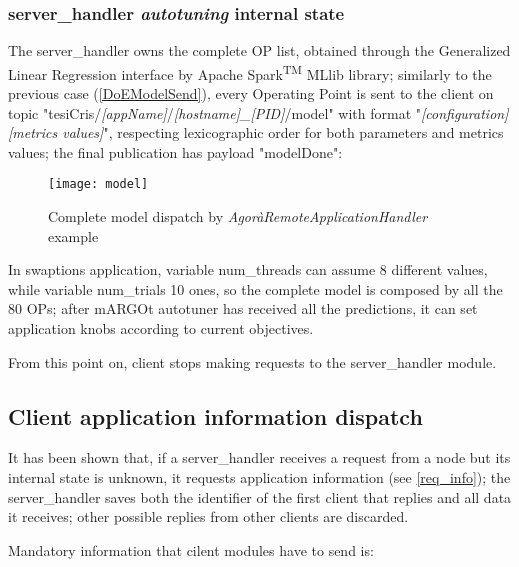 \subsubsection{server\_handler \textit{autotuning} internal state}\label{modelSend}

The server\_handler owns the complete OP list, obtained through the Generalized Linear Regression interface by Apache Spark\textsuperscript{TM} MLlib library; similarly to the previous case (\ref{DoEModelSend}), every Operating Point is sent to the client on topic "tesiCris\slash{}\textit{[app\-Name]}\slash{}\textit{[host\-name]\_[PID]}\slash{}model" with format "\textit{[configuration] [metrics values]}", respecting lexicographic order for both parameters and metrics values; the final publication has payload "modelDone":

\begin{figure}[H]

    \centering
    \texttt{[image: model]}
    \caption{Complete model dispatch by \textit{AgoràRemoteApplicationHandler} example}
    \label{fig:model}
    
\end{figure}

In swaptions application, variable num\_threads can assume 8 different values, while variable num\_trials 10 ones, so the complete model is composed by all the 80 OPs; after mARGOt autotuner has received all the predictions, it can set application knobs according to current objectives.

From this point on, client stops making requests to the ser\-ver\_han\-dler module.





\subsection{Client application information dispatch}\label{client_info}

It has been shown that, if a server\_handler receives a request from a node but its internal state is unknown, it requests application information (see \ref{req_info}); the server\_handler saves both the identifier of the first client that replies and all data it receives; other possible replies from other clients are discarded.

Mandatory information that cilent modules have to send is:

